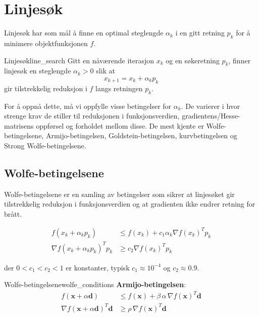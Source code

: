 \section{Linjesøk}\label{sec:line_search}
Linjesøk har som mål å finne en optimal steglengde \(\alpha_k\) i en gitt retning \(p_k\) for å minimere objektfunksjonen \(f\).

\begin{definition}{Linjesøk}{line_search}
	Gitt en nåværende iterasjon \(x_k\) og en søkeretning \(p_k\), finner linjesøk en steglengde \(\alpha_k > 0\) slik at
	\[
		x_{k+1} = x_k + \alpha_k p_k
	\]
	gir tilstrekkelig reduksjon i \(f\) langs retningen \(p_k\).
\end{definition}

For å oppnå dette, må vi oppfylle visse betingelser for \(\alpha_k\).
De varierer i hvor strenge krav de stiller til reduksjonen i funksjonsverdien, gradientens/Hesse-matrisens oppførsel og forholdet mellom disse.
De mest kjente er Wolfe-betingelsene, Armijo-betingelsen, Goldstein-betingelsen, kurvbetingelsen og Strong Wolfe-betingelsene.

\subsection{Wolfe-betingelsene}
Wolfe-betingelsene er en samling av betingelser som sikrer at linjesøket gir tilstrekkelig reduksjon i funksjonsverdien og at gradienten ikke endrer retning for brått.


\begin{align}
	f(x_k + \alpha_k p_k)              & \leq f(x_k) + c_1 \alpha_k \nabla f(x_k)^T p_k \tag{Armijo betingelse} \\
	\nabla f(x_k + \alpha_k p_k)^T p_k & \geq c_2 \nabla f(x_k)^T p_k \tag{Krumningsbetingelse}
\end{align}

der \(0 < c_1 < c_2 < 1\) er konstanter, typisk \(c_1 \approx 10^{-4}\) og \(c_2 \approx 0.9\).

\begin{definition}{Wolfe-betingelsene}{wolfe_conditions}
	\textbf{Armijo-betingelsen}:
	\begin{align*}
		f(\symbf{x} + \alpha \symbf{d})                    & \le f(\symbf{x}) + \beta\,\alpha\,\nabla f(\symbf{x})^T \symbf{d} \tag{Armijo} \\
		\nabla f(\symbf{x} + \alpha \symbf{d})^T \symbf{d} & \ge \rho \,\nabla f(\symbf{x})^T \symbf{d} \tag{Krumningsbetingelse}
	\end{align*}
\end{definition}

